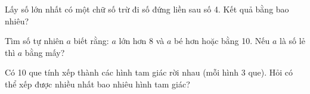 \begin{ex} %
Lấy số lớn nhất có một chữ số trừ đi số đứng liền sau số 4. Kết quả bằng bao nhiêu?
\end{ex}

\begin{ex} %
Tìm số tự nhiên $a$ biết rằng: $a$ lớn hơn 8 và $a$ bé hơn hoặc bằng 10. Nếu $a$ là số lẻ thì $a$ bằng mấy?
\end{ex}

\begin{ex} %
Có 10 que tính xếp thành các hình tam giác rời nhau (mỗi hình 3 que). Hỏi có thể xếp được nhiều nhất bao nhiêu hình tam giác?
\end{ex}
